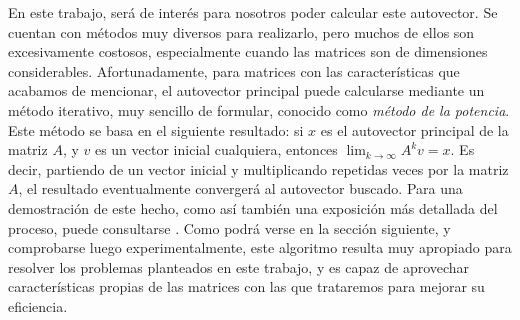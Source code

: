         En este trabajo, será de interés para nosotros poder calcular este autovector. Se cuentan con métodos muy diversos para realizarlo, pero muchos de ellos son excesivamente costosos, especialmente cuando las matrices son de dimensiones considerables. Afortunadamente, para matrices con las características que acabamos de mencionar, el autovector principal puede calcularse mediante un método iterativo, muy sencillo de formular, conocido como \emph{método de la potencia}. Este método se basa en el siguiente resultado: si $x$ es el autovector principal de la matriz $A$, y $v$ es un vector inicial cualquiera, entonces $\lim_{k\to\infty}A^k v = x$. Es decir, partiendo de un vector inicial y multiplicando repetidas veces por la matriz $A$, el resultado eventualmente convergerá al autovector buscado. Para una demostración de este hecho, como así también una exposición más detallada del proceso, puede consultarse \cite[Sección 3]{Kamvar2003}. Como podrá verse en la sección siguiente, y comprobarse luego experimentalmente, este algoritmo resulta muy apropiado para resolver los problemas planteados en este trabajo, y es capaz de aprovechar características propias de las matrices con las que trataremos para mejorar su eficiencia.
